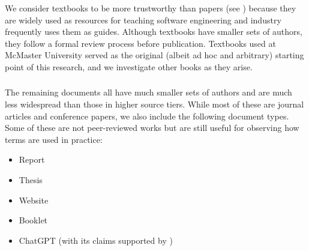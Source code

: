 \subsubsection{}
\label{texts}

We consider textbooks to be more trustworthy than papers (see )
because they are widely used as resources for teaching software engineering and
industry frequently uses them as guides. Although textbooks have smaller sets of
authors, they follow a formal review process before publication. Textbooks used
at McMaster University \citep{Patton2006,PetersAndPedrycz2000,vanVliet2000}
served as the original (albeit ad hoc and arbitrary) starting point of this
research, and we investigate other books as they arise. \addTextEx{}

\subsubsection{}
\label{papers}

The remaining documents all have much smaller sets of authors and are much less
widespread than those in higher source tiers. While most of these are journal
articles and conference papers, we also include the following document types.
Some of these are not peer-reviewed works but are still useful for
observing how terms are used in practice:

\begin{itemize}
    \item Report \citep{Kam2008,Gerrard2000a,Gerrard2000b}
    \item Thesis \citep{Bas2024}
    \item Website \citep{LambdaTest2024,Pandey2023}
    \item Booklet \citep{SPICE2022}
    \item \ifnotpaper \else ChatGPT \fi \citet{ChatGPT2024} (with its claims
          supported by \citet{RusEtAl2008})
\end{itemize}

\ifnotpaper\else
    \begin{table*}[t!]
        \ieeeCatsTable{}
    \end{table*}
\fi

